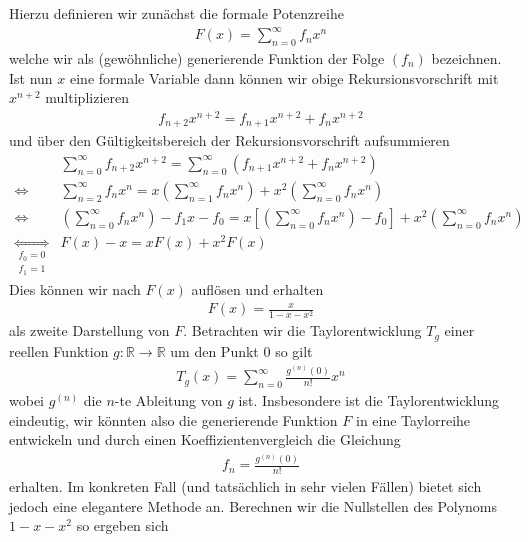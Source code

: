 \documentclass[a4paper,11pt]{article}
\theoremstyle{mytheor}
\newcommand{\R}[0]{\mathbb{R}}
\begin{document}
Hierzu definieren wir zunächst die formale Potenzreihe
\begin{align*}
    F(x) = \sum_{n=0}^\infty f_n x^n
\end{align*}
welche wir als (gewöhnliche) generierende Funktion der Folge $(f_n)$ bezeichnen. Ist nun $x$ eine formale Variable dann können wir obige Rekursionsvorschrift mit $x^{n+2}$ multiplizieren
\begin{align*}
    f_{n+2}x^{n+2} = f_{n+1} x^{n+2} + f_n x^{n+2}
\end{align*}
und über den Gültigkeitsbereich der Rekursionsvorschrift aufsummieren
\begin{align*}
         & \sum_{n=0}^\infty f_{n+2}x^{n+2} = \sum_{n=0}^\infty (f_{n+1} x^{n+2} + f_n x^{n+2})                                                                               \\
    \iff & \sum_{n=2}^\infty f_n x^n = x \left(\sum_{n=1}^\infty f_n x^n \right) + x^2 \left(\sum_{n=0}^\infty f_n x^n \right)                                                \\
    \iff & \left( \sum_{n=0}^\infty f_n x^n \right) - f_1 x - f_0 = x \left[\left(\sum_{n=0}^\infty f_n x^n\right) - f_0\right] + x^2 \left( \sum_{n=0}^\infty f_n x^n\right) \\
    \underset{\substack{f_0 = 0                                                                                                                                               \\ f_1 = 1}}{\iff} & F(x) - x = x F(x) + x^2 F(x)
\end{align*}
Dies können wir nach $F(x)$ auflösen und erhalten
\begin{align*}
    F(x) = \frac{x}{1-x-x^2}
\end{align*}
als zweite Darstellung von $F$.
Betrachten wir die Taylorentwicklung $T_g$ einer reellen Funktion $g : \R \to \R$ um den Punkt $0$ so gilt
\begin{align*}
    T_g(x) = \sum_{n=0}^\infty \frac{g^{(n)}(0)}{n!} x^n
\end{align*}
wobei $g^{(n)}$ die $n$-te Ableitung von $g$ ist. Insbesondere ist die Taylorentwicklung eindeutig, wir könnten also die generierende Funktion $F$ in eine Taylorreihe entwickeln und durch einen Koeffizientenvergleich die Gleichung
\begin{align*}
    f_n = \frac{g^{(n)}(0)}{n!}
\end{align*}
erhalten. Im konkreten Fall (und tatsächlich in sehr vielen Fällen) bietet sich jedoch eine elegantere Methode an. Berechnen wir die Nullstellen des Polynoms $1-x-x^2$ so ergeben sich
\end{document}
